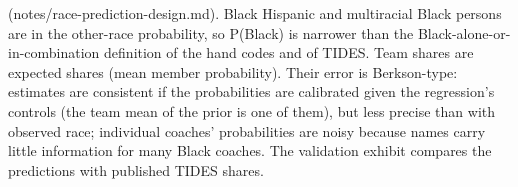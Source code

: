 {(notes/race-prediction-design.md). Black Hispanic and multiracial Black persons are in the other-race probability, so P(Black) is narrower than the Black-alone-or-in-combination definition of the hand codes and of TIDES. Team shares are expected shares (mean member probability). Their error is Berkson-type: estimates are consistent if the probabilities are calibrated given the regression's controls (the team mean of the prior is one of them), but less precise than with observed race; individual coaches' probabilities are noisy because names carry little information for many Black coaches. The validation exhibit compares the predictions with published TIDES shares.
\par}

